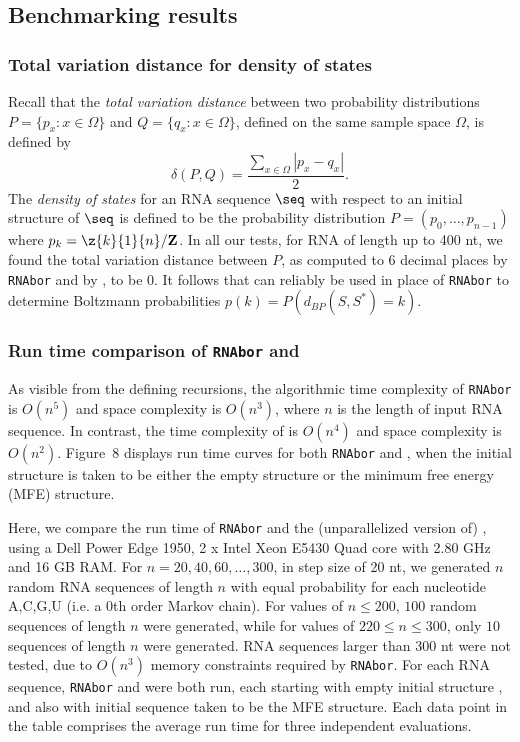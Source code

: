\subsection*{Benchmarking results}

\subsubsection*{Total variation distance for density of states}

Recall that the {\em total variation distance}
between two probability distributions
$P = \{ p_{x} : x \in \Omega\}$ and
$Q = \{ q_{x} : x \in \Omega\}$, defined on the same sample space $\Omega$, is
defined by
\[
\delta(P,Q) = \frac{\sum_{x \in \Omega} |p_x - q_x|}{2}.
\]
The {\em density of states} for an RNA sequence $\seq$ with respect to
an initial structure \strSt of $\seq$ is defined to be the probability
distribution
$P = (p_0,\ldots,p_{n-1})$ where $p_k = \z{k}{1}{n}/{\bf Z}$.
In all our tests, for RNA of length up to 400 nt, we found the total
variation distance between $P$, as computed to 6 decimal places by
{\tt RNAbor} and by \fftbor, to be $0$. It follows that \fftbor
can reliably be used in place of {\tt RNAbor} to determine Boltzmann
probabilities $p(k) = P\left( d_{BP}(S,S^*)=k \right)$.

\subsubsection*{Run time comparison of {\tt RNAbor} and \fftbor}

As visible from the defining recursions, the algorithmic time complexity of
{\tt RNAbor} is $O(n^5)$ and space complexity is $O(n^3)$, where $n$ is
the length of input RNA sequence. In contrast, the time complexity of
\fftbor is $O(n^4)$ and space complexity is $O(n^2)$.
Figure~8 displays run time curves for both
{\tt RNAbor} and \fftbor, when the initial structure \strSt is
taken to be either the empty structure or the minimum free energy
(MFE) structure.

Here, we compare the run time of {\tt RNAbor} \cite{Freyhult.b07} and
the (unparallelized version of) \fftbor, using
a Dell Power Edge 1950, 2 x Intel Xeon E5430 Quad
core with 2.80 GHz and 16 GB RAM. For $n = 20,40,60,\ldots, 300$, in step
size of 20 nt, we generated $n$ random RNA sequences of length $n$ with equal
probability for each nucleotide A,C,G,U (i.e. a $0$th order Markov chain).
For values of $n \leq 200$, $100$ random sequences of length
$n$ were generated, while for values of $220 \leq n \leq 300$, only
$10$ sequences of length $n$ were generated.
RNA sequences larger than 300 nt were not tested,
due to $O(n^3)$ memory constraints required by {\tt RNAbor}.
For each RNA sequence, {\tt RNAbor} and \fftbor were both run,
each starting with empty initial structure \strSt, and also
with initial sequence \strSt taken to be the MFE structure.
Each data point in the table comprises the average run time for three
independent evaluations.

